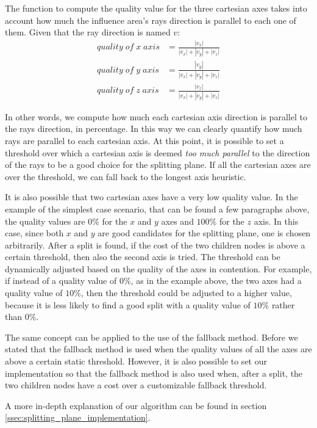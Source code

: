 \documentclass{PoliMi_MasterThesis}
\begin{document}
The function to compute the quality value for the three cartesian axes takes into account how much the influence area's rays direction is parallel to each one of them. Given that the ray direction is named $v$:
\begin{align*}
	quality\;of\;x\;axis &= \frac{|v_x|}{|v_x|+|v_y|+|v_z|} \\
	quality\;of\;y\;axis &= \frac{|v_y|}{|v_x|+|v_y|+|v_z|} \\
	quality\;of\;z\;axis &= \frac{|v_z|}{|v_x|+|v_y|+|v_z|}
\end{align*}

In other words, we compute how much each cartesian axis direction is parallel to the rays direction, in percentage. In this way we can clearly quantify how much rays are parallel to each cartesian axis. At this point, it is possible to set a threshold over which a cartesian axis is deemed \textit{too much parallel} to the direction of the rays to be a good choice for the splitting plane. If all the cartesian axes are over the threshold, we can fall back to the longest axis heuristic.

It is also possible that two cartesian axes have a very low quality value. In the example of the simplest case scenario, that can be found a few paragraphs above, the quality values are $0\%$ for the $x$ and $y$ axes and $100\%$ for the $z$ axis. In this case, since both $x$ and $y$ are good candidates for the splitting plane, one is chosen arbitrarily. After a split is found, if the cost of the two children nodes is above a certain threshold, then also the second axis is tried. The threshold can be dynamically adjusted based on the quality of the axes in contention. For example, if instead of a quality value of $0\%$, as in the example above, the two axes had a quality value of $10\%$, then the threshold could be adjusted to a higher value, because it is less likely to find a good split with a quality value of $10\%$ rather than $0\%$.

The same concept can be applied to the use of the fallback method. Before we stated that the fallback method is used when the quality values of all the axes are above a certain static threshold. However, it is also possible to set our implementation so that the fallback method is also used when, after a split, the two children nodes have a cost over a customizable fallback threshold.

A more in-depth explanation of our algorithm can be found in section \ref{ssec:splitting_plane_implementation}.
\end{document}
